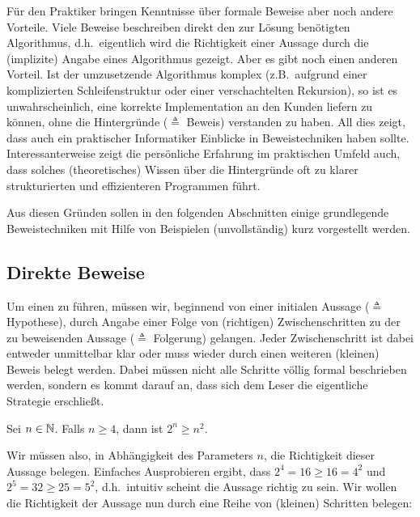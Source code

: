 Für den Praktiker bringen Kenntnisse über formale Beweise aber noch
andere Vorteile. Viele Beweise beschreiben direkt den zur Lösung
benötigten Algorithmus, d.h.~eigentlich wird die Richtigkeit einer
Aussage durch die (implizite) Angabe eines Algorithmus gezeigt. Aber
es gibt noch einen anderen Vorteil. Ist der umzusetzende Algorithmus
komplex (z.B.~aufgrund einer komplizierten Schleifenstruktur oder
einer verschachtelten Rekursion), so ist es unwahrscheinlich, eine
korrekte Implementation an den Kunden liefern zu können, ohne die
Hintergründe ($\triangleq$ Beweis) verstanden zu haben. All dies
zeigt, dass auch ein praktischer Informatiker Einblicke in
Beweistechniken haben sollte. Interessanterweise zeigt die persönliche
Erfahrung im praktischen Umfeld auch, dass solches (theoretisches)
Wissen über die Hintergründe oft zu klarer strukturierten und
effizienteren Programmen führt.

Aus diesen Gründen sollen in den folgenden Abschnitten einige
grundlegende Beweistechniken mit Hilfe von Beispielen (unvollständig)
kurz vorgestellt werden.

\subsection{Direkte Beweise}
Um einen  zu führen,
müssen wir, beginnend von einer initialen Aussage ($\triangleq$
Hypothese), durch Angabe einer Folge von (richtigen) Zwischenschritten
zu der zu beweisenden Aussage ($\triangleq$ Folgerung) gelangen. Jeder
Zwischenschritt ist dabei entweder unmittelbar klar oder muss wieder
durch einen weiteren (kleinen) Beweis belegt werden. Dabei müssen
nicht alle Schritte völlig formal beschrieben werden, sondern es kommt
darauf an, dass sich dem Leser die eigentliche Strategie erschließt.

\goodbreak
\begin{theorem}
\label{ExpoGTSquare}
Sei $n \in \mathbb N$. Falls $n \ge 4$, dann ist $2^n \ge n^2$.
\end{theorem}

Wir müssen also, in Abhängigkeit des Parameters $n$, die Richtigkeit
dieser Aussage belegen. Einfaches Ausprobieren ergibt, dass $2^4 = 16
\ge 16 = 4^2$ und $2^5 = 32 \ge 25 = 5^2$, d.h.~intuitiv scheint die
Aussage richtig zu sein. Wir wollen die Richtigkeit der Aussage nun
durch eine Reihe von (kleinen) Schritten belegen:

